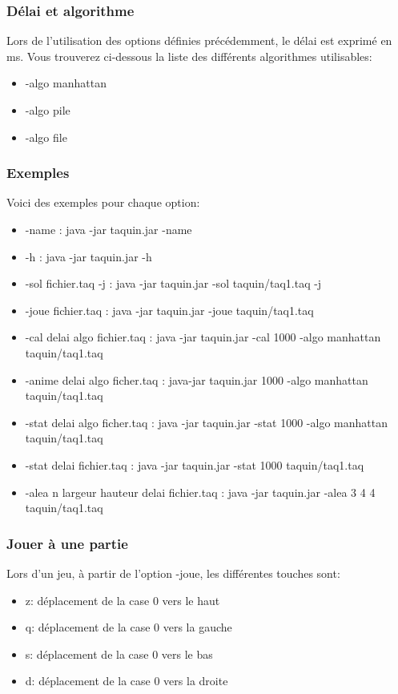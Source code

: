 \documentclass{beamer}
\begin{document}
  \begin{frame}
	\frametitle{Délai et algorithme}
	Lors de l'utilisation des options définies précédemment, le délai est exprimé en ms. Vous trouverez ci-dessous la liste des différents algorithmes utilisables:
	\begin{itemize}
	\item -algo manhattan
	\item -algo pile
	\item -algo file
	\end{itemize}
  \end{frame}
  \begin{frame}
   \frametitle{Exemples}
	Voici des exemples pour chaque option:
\begin{itemize}
	\item -name : java -jar taquin.jar -name
	\item -h : java -jar taquin.jar -h
	\item -sol fichier.taq -j : java -jar taquin.jar -sol taquin/taq1.taq -j
	\item -joue fichier.taq : java -jar taquin.jar -joue taquin/taq1.taq
	\item -cal delai algo fichier.taq : java -jar taquin.jar -cal 1000 -algo manhattan taquin/taq1.taq
	\item -anime delai algo ficher.taq : java-jar taquin.jar 1000 -algo manhattan taquin/taq1.taq
	\item -stat delai algo ficher.taq : java -jar taquin.jar -stat 1000 -algo manhattan taquin/taq1.taq
	\item -stat delai fichier.taq : java -jar taquin.jar -stat 1000 taquin/taq1.taq
	\item -alea n largeur hauteur delai fichier.taq : java -jar taquin.jar -alea 3 4 4 taquin/taq1.taq
	\end{itemize}
  \end{frame}
  \begin{frame}
   \frametitle{Jouer à une partie}
	Lors d'un jeu, à partir de l'option -joue, les différentes touches sont:
	\begin{itemize}
	\item z: déplacement de la case 0 vers le haut
	\item q: déplacement de la case 0 vers la gauche
	\item s: déplacement de la case 0 vers le bas
	\item d: déplacement de la case 0 vers la droite
	\end{itemize}
	\end{frame}
\end{document}
